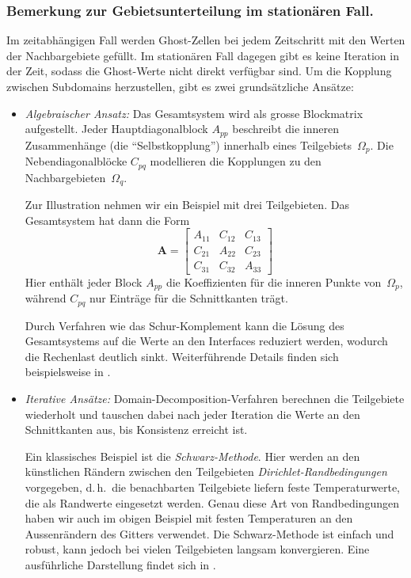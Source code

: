 \subsubsection*{Bemerkung zur Gebietsunterteilung im stationären Fall.}  
Im zeitabhängigen Fall werden Ghost-Zellen bei jedem Zeitschritt mit den Werten der Nachbargebiete gefüllt.  
Im stationären Fall dagegen gibt es keine Iteration in der Zeit, sodass die Ghost-Werte nicht direkt verfügbar sind.  
Um die Kopplung zwischen Subdomains herzustellen, gibt es zwei grundsätzliche Ansätze:

\begin{itemize}
	\item \emph{Algebraischer Ansatz:}  
	Das Gesamtsystem wird als grosse Blockmatrix aufgestellt.  
%
	Jeder Hauptdiagonalblock \(A_{pp}\) beschreibt die inneren Zusammenhänge (die ``Selbstkopplung'') innerhalb eines Teilgebiets~\(\Omega_p\).  
%
%
	Die Nebendiagonalblöcke \(C_{pq}\) modellieren die Kopplungen zu den Nachbargebieten~\(\Omega_q\).  
	
	Zur Illustration nehmen wir ein Beispiel mit drei Teilgebieten.  
	Das Gesamtsystem hat dann die Form
	\[
	\mathbf{A} =
	\begin{bmatrix}
		A_{11} & C_{12} & C_{13} \\
		C_{21} & A_{22} & C_{23} \\
		C_{31} & C_{32} & A_{33}
	\end{bmatrix}
	\]
	Hier enthält jeder Block \(A_{pp}\) die Koeffizienten für die inneren Punkte von~\(\Omega_p\), 
	während \(C_{pq}\) nur Einträge für die Schnittkanten trägt.  
	
	Durch Verfahren wie das Schur-Komplement kann die Lösung des Gesamtsystems auf die Werte an den Interfaces reduziert werden, 
%
	wodurch die Rechenlast deutlich sinkt.  
	Weiterführende Details finden sich beispielsweise in \cite{parallelisierung:smith1996}.
	
	\item \emph{Iterative Ansätze:}  
	Domain-Decomposition-Verfahren berechnen die Teilgebiete wiederholt und tauschen dabei nach jeder Iteration die Werte an den Schnittkanten aus, bis Konsistenz erreicht ist.  
	
	Ein klassisches Beispiel ist die \emph{Schwarz-Methode}.  
%
	Hier werden an den künstlichen Rändern zwischen den Teilgebieten \emph{Dirichlet-Randbedingungen} vorgegeben, d.\,h.\ die benachbarten Teilgebiete liefern feste Temperaturwerte, die als Randwerte eingesetzt werden.  
%
	Genau diese Art von Randbedingungen haben wir auch im obigen Beispiel mit festen Temperaturen an den Aussenrändern des Gitters verwendet.  
	Die Schwarz-Methode ist einfach und robust, kann jedoch bei vielen Teilgebieten langsam konvergieren.  
	Eine ausführliche Darstellung findet sich in \cite{parallelisierung:quarteroniValli1999}.  
	

\end{itemize}
